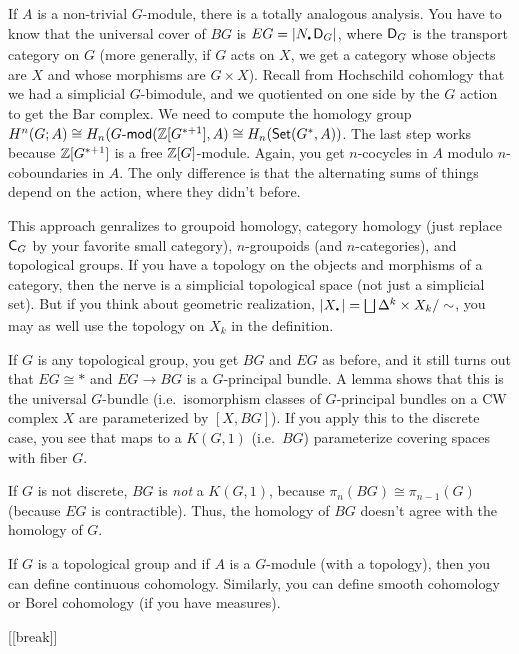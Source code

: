 If $A$ is a non-trivial $G$-module, there is a totally analogous analysis. You have to know that the universal cover of $BG$ is $EG=|N_\udot \D_G|$, where $\text{\sf D}_G$ is the transport category on $G$ (more generally, if $G$ acts on $X$, we get a category whose objects are $X$ and whose morphisms are $G\times X$). Recall from Hochschild cohomlogy that we had a simplicial $G$-bimodule, and we quotiented on one side by the $G$ action to get the Bar complex. We need to compute the homology group $H^n(G;A)\cong H_n(G\textrm{-\sf mod}(\mathbb{Z}[G^{*+1}],A)\cong H_n(\operatorname{\sf Set}(G^*,A))$. The last step works because $\mathbb{Z}[G^{*+1}]$ is a free $\mathbb{Z} [G]$-module. Again, you get $n$-cocycles in $A$ modulo $n$-coboundaries in $A$. The only difference is that the alternating sums of things depend on the action, where they didn't before.
\begin{remark}
 This approach genralizes to groupoid homology, category homology (just replace $\text{\sf C}_G$ by your favorite small category), $n$-groupoids (and $n$-categories), and topological groups. If you have a topology on the objects and morphisms of a category, then the nerve is a simplicial topological space (not just a simplicial set). But if you think about geometric realization, $|X_\udot| = \bigsqcup \Delta^k\times X_k/\sim$, you may as well use the topology on $X_k$ in the definition.
 
 If $G$ is any topological group, you get $BG$ and $EG$ as before, and it still turns out that $EG\cong *$ and $EG\to BG$ is a $G$-principal bundle. A lemma shows that this is the universal $G$-bundle (i.e.~isomorphism classes of $G$-principal bundles on a CW complex $X$ are parameterized by $[X,BG]$). If you apply this to the discrete case, you see that maps to a $K(G,1)$ (i.e.~$BG$) parameterize covering spaces with fiber $G$.
\end{remark}
\begin{warning}
 If $G$ is not discrete, $BG$ is \emph{not} a $K(G,1)$, because $\pi_n(BG)\cong \pi_{n-1}(G)$ (because $EG$ is contractible). Thus, the homology of $BG$ doesn't agree with the homology of $G$.
\end{warning}
If $G$ is a topological group and if $A$ is a $G$-module (with a topology), then you can define continuous cohomology. Similarly, you can define smooth cohomology or Borel cohomology (if you have measures).

[[break]]


